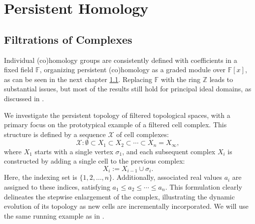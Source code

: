\section{Persistent Homology}
\subsection{Filtrations of Complexes}
Individual (co)homology groups are consistently defined with coefficients in a
fixed field $\mathbb{F}$, organizing persistent (co)homology as a graded module
over $\mathbb{F}[x]$, as can be seen in the next chapter \ref{}. Replacing
$\mathbb{F}$ with the ring $\mathbb{Z}$ leads to substantial issues, but most of
the results still hold for principal ideal domains, as discussed in
\cite[\S 3.1]{zomorodian2004computing}.

We investigate the persistent topology of filtered topological spaces, with a primary
focus on the prototypical example of a filtered cell complex. This structure is
defined by a sequence $\mathcal{X}$ of cell complexes:
\begin{equation*}
	\mathcal{X}: \emptyset \subset X_{1} \subset X_{2} \subset \cdots \subset X_{n}
	= X_{\infty},
\end{equation*}
where $X_{1}$ starts with a single vertex $\sigma_{1}$, and each subsequent
complex $X_{i}$ is constructed by adding a single cell to the previous complex:
\begin{equation*}
	X_{i} := X_{i-1}\cup \sigma_{i}.
\end{equation*}
Here, the indexing set is $\{1, 2, \ldots, n\}$. Additionally, associated real
values $a_{i}$ are assigned to these indices, satisfying $a_{1} \leq a_{2} \leq \cdots
\leq a_{n}.$ This formulation clearly delineates the stepwise enlargement of the
complex, illustrating the dynamic evolution of its topology as new cells are
incrementally incorporated. We will use the same running example as in \cite[\S 2.2]{de2011dualities}.

